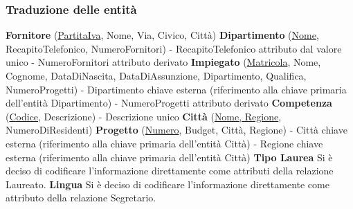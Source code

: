 \documentclass{article}
\begin{document}
\subsubsection{Traduzione delle entità}
\textbf{Fornitore} (\underline{PartitaIva}, Nome, Via, Civico, Città)
\newline
\newline
\textbf{Dipartimento} (\underline{Nome}, RecapitoTelefonico, NumeroFornitori)
\newline
- RecapitoTelefonico attributo dal valore unico
\newline
- NumeroFornitori attributo derivato
\newline
\newline
\textbf{Impiegato} (\underline{Matricola}, Nome, Cognome, DataDiNascita, DataDiAssunzione, Dipartimento, Qualifica, NumeroProgetti)
\newline
- Dipartimento chiave esterna (riferimento alla chiave primaria dell'entità Dipartimento)
\newline
- NumeroProgetti attributo derivato
\newline
\newline
\textbf{Competenza} (\underline{Codice}, Descrizione)
\newline
- Descrizione unico
\newline
\newline
\textbf{Città} (\underline{Nome, Regione}, NumeroDiResidenti)
\newline
\newline
\textbf{Progetto} (\underline{Numero}, Budget, Città, Regione)
\newline
- Città chiave esterna (riferimento alla chiave primaria dell'entità Città)
\newline
- Regione chiave esterna (riferimento alla chiave primaria dell'entità Città)
\newline
\newline
\textbf{Tipo Laurea}
\newline
Si è deciso di codificare l'informazione direttamente come attributi della relazione Laureato.
\newline
\newline
\textbf{Lingua}
\newline
Si è deciso di codificare l'informazione direttamente come attributo della relazione Segretario.
\end{document}
